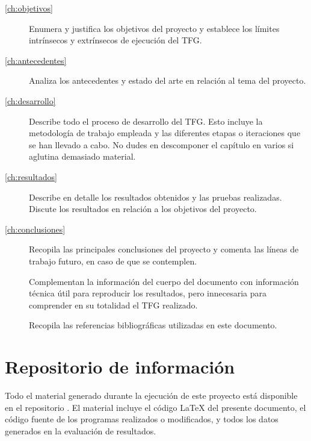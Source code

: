 \begin{description}
    \item[\autoref{ch:objetivos}] Enumera y justifica los objetivos del proyecto y establece los límites intrínsecos y extrínsecos de ejecución del TFG.
    \item[\autoref{ch:antecedentes}] Analiza los antecedentes y estado del arte en relación al tema del proyecto.
    \item[\autoref{ch:desarrollo}] Describe todo el proceso de desarrollo del TFG.  Esto incluye la metodología de trabajo empleada y las diferentes etapas o iteraciones que se han llevado a cabo.  No dudes en descomponer el capítulo en varios si aglutina demasiado material.
    \item[\autoref{ch:resultados}] Describe en detalle los resultados obtenidos y las pruebas realizadas. Discute los resultados en relación a los objetivos del proyecto.
    \item[\autoref{ch:conclusiones}] Recopila las principales conclusiones del proyecto y comenta las líneas de trabajo futuro, en caso de que se contemplen.
    \item[] Complementan la información del cuerpo del documento con información técnica útil para reproducir los resultados, pero innecesaria para comprender en su totalidad el TFG realizado.
    \item[] Recopila las referencias bibliográficas utilizadas en este documento.
\end{description}


\section{Repositorio de información}
\label{sec:repositorio}


Todo el material generado durante la ejecución de este proyecto está disponible en el repositorio \thegitrepo{}.  El material incluye el código \LaTeX{} del presente documento, el código fuente de los programas realizados o modificados, y todos los datos generados en la evaluación de resultados.